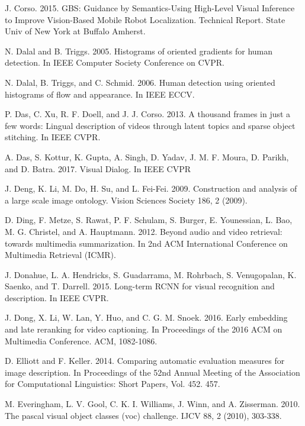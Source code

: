 \documentclass[10pt,journal,compsoc]{IEEEtran}
\begin{document}
\begin{thebibliography}{1}
J. Corso. 2015. GBS: Guidance by Semantics-Using High-Level Visual Inference to Improve Vision-Based Mobile Robot Localization. Technical Report. State Univ of New York at Buffalo Amherst.

N. Dalal and B. Triggs. 2005. Histograms of oriented gradients for human detection. In IEEE Computer Society Conference on CVPR.

N. Dalal, B. Triggs, and C. Schmid. 2006. Human detection using oriented histograms of flow and appearance. In IEEE ECCV. %

P. Das, C. Xu, R. F. Doell, and J. J. Corso. 2013. A thousand frames in just a few words: Lingual description of videos through latent topics and sparse object stitching. In IEEE CVPR.

A. Das, S. Kottur, K. Gupta, A. Singh, D. Yadav, J. M. F. Moura,
D. Parikh, and D. Batra. 2017. Visual Dialog. In IEEE CVPR


J. Deng, K. Li, M. Do, H. Su, and L. Fei-Fei. 2009. Construction and analysis of a large scale image ontology. Vision Sciences Society 186, 2 (2009).

\bibitem{}
D. Ding, F. Metze, S. Rawat, P. F. Schulam, S. Burger, E. Younessian, L. Bao, M. G. Christel, and A. Hauptmann. 2012. Beyond audio and video retrieval: towards multimedia summarization. In 2nd ACM International Conference on Multimedia Retrieval (ICMR).

J. Donahue, L. A. Hendricks, S. Guadarrama, M. Rohrbach, S. Venugopalan, K. Saenko, and T. Darrell. 2015. Long-term RCNN for visual recognition and description. In IEEE CVPR.

J. Dong, X. Li, W. Lan, Y. Huo, and C. G. M. Snoek. 2016. Early embedding and late reranking for video captioning. In Proceedings of the 2016 ACM on Multimedia Conference. ACM, 1082-1086.

D. Elliott and F. Keller. 2014. Comparing automatic evaluation measures for image description. In Proceedings of the 52nd Annual Meeting of the Association for Computational Linguistics: Short Papers, Vol. 452. 457.

M. Everingham, L. V. Gool, C. K. I. Williams, J. Winn, and A. Zisserman. 2010. The pascal visual object classes (voc) challenge. IJCV 88, 2 (2010), 303-338.


\end{thebibliography}
\end{document}

